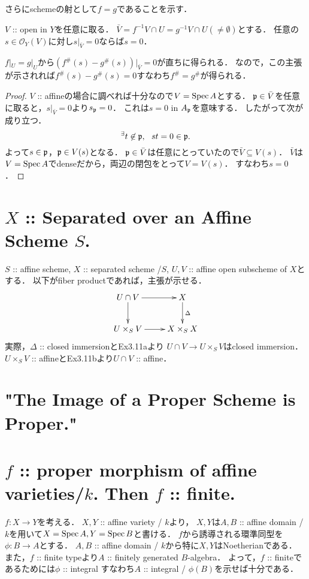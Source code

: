 \documentclass[a4paper]{jsarticle}
\newcommand{\shO}{\mathcal{O}}
\begin{document}
    さらにschemeの射として$f=g$であることを示す．
    \begin{Claim}
        $V$ :: open in $Y$を任意に取る．
        $\bar{V}=f^{-1}V \cap U=g^{-1}V \cap U(\neq \emptyset)$とする．
        任意の$s \in \shO_Y(V)$に対し$s|_{\bar{V}}=0$ならば$s=0$．
    \end{Claim}
    $f|_U=g|_U$から$(f^{\#}(s)-g^{\#}(s))|_{\bar{V}}=0$が直ちに得られる．
    なので，この主張が示されれば$f^{\#}(s)-g^{\#}(s)=0$すなわち$f^{\#}=g^{\#}$が得られる．
    \begin{proof}
        $V$ :: affineの場合に調べれば十分なので$V=\operatorname{Spec} A$とする．
        $\mathfrak{p} \in \bar{V}$を任意に取ると，$s|_{\bar{V}}=0$より$s_{\mathfrak{p}}=0$．
        これは$s=0$ in $A_{\mathfrak{p}}$を意味する．
        したがって次が成り立つ．
        \[ {}^{\exists} t \not \in \mathfrak{p},~~ st=0 \in \mathfrak{p}. \]
        よって$s \in \mathfrak{p}$，$\mathfrak{p} \in V(s)$となる．
        $\mathfrak{p} \in \bar{V}$は任意にとっていたので$\bar{V} \subseteq V(s)$．
        $\bar{V}$は$V=\operatorname{Spec} A$でdenseだから，両辺の閉包をとって$V=V(s)$．
        すなわち$s=0$．
    \end{proof}

\section{$X$ :: Separated over an Affine Scheme $S$.} %
    $S$ :: affine scheme, $X$ :: separated scheme /$S$,
    $U, V$ :: affine open subscheme of $X$とする．
    以下がfiber productであれば，主張が示せる．
    \[
    \xymatrix
    {
        U \cap V \ar[d]\ar[r]& X \ar[d]^-{\Delta} \\
    U \times_S V \ar[r]& X \times_S X
    }
    \]
    実際，$\Delta$ :: closed immersionとEx3.11aより
    $U \cap V \to U \times_S V$はclosed immersion．
    $U \times_S V$ :: affineとEx3.11bより$U \cap V$ :: affine．

\section{"The Image of a Proper Scheme is Proper."} %

\section{ } %

\section{$f$ :: proper morphism of affine varieties/$k$. Then $f$ :: finite.} %
    $f: X \to Y$を考える．
    $X,Y$ :: affine variety / $k$より，
    $X,Y$は$A, B$ :: affine domain / $k$を用いて$X=\operatorname{Spec} A, Y=\operatorname{Spec} B$と書ける．
    $f$から誘導される環準同型を$\phi: B \to A$とする．
    $A, B$ :: affine domain / $k$から特に$X, Y$はNoetherianである．
    また，$f$ :: finite typeより$A$ :: finitely generated $B$-algebra．
    よって，$f$ :: finiteであるためには$\phi$ :: integral
    すなわち$A$ :: integral / $\phi(B)$を示せば十分である．
\end{document}
